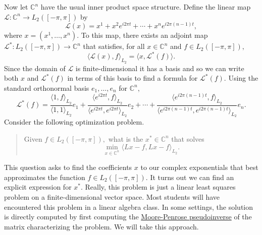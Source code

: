 Now let \(\mathbb{C}^n\) have the usual inner product space structure.
Define the linear map \(\mathcal{L}: \mathbb{C}^n \to L_2([-\pi, \pi])\) by
\[
  \mathcal{L}(x)
    =
      x^1 + x^2 e^{i 2 \pi t} + \cdots + x^{n} e^{i 2 \pi (n-1) t},
\]
where \(x = (x^1, \ldots, x^n).\)
To this map, there exists an adjoint map \(\mathcal{L}^*: L_2([-\pi, \pi]) \to \mathbb{C}^n\) that satisfies, for all \(x \in \mathbb{C}^n\) and \(f \in L_2([-\pi, \pi]),\)
\[
  \langle \mathcal{L}(x), f \rangle_{L_2}
  =
  \langle x, \mathcal{L}^*(f) \rangle.
\]
Since the domain of \(\mathcal{L}\) is finite-dimensional it has a basis and so we can write both \(x\) and \(\mathcal{L}^*(f)\) in terms of this basis to find a formula for \(\mathcal{L}^*(f).\)
Using the standard orthonormal basis \(e_1, \ldots, e_n\) for \(\mathbb{C}^n,\)
\[
  \mathcal{L}^*(f)
    =
      \frac{\langle 1, f \rangle_{L_2}}{\langle 1, 1\rangle_{L_2}}
      e_1
      +
      \frac{\langle e^{i 2 \pi t}, f \rangle_{L_2}}{\langle e^{i 2 \pi t}, e^{i 2 \pi t}\rangle_{L_2}}
      e_2
      +
      \cdots
      +
      \frac{\langle e^{i 2 \pi (n-1) t}, f \rangle_{L_2}}{\langle e^{i 2 \pi(n-1)t}, e^{i 2 \pi(n-1) t}\rangle_{L_2}}
      e_n.
\]
Consider the following optimization problem.
%
\begin{quote}
  Given \(f \in L_2([-\pi, \pi]),\) what is the \(x^* \in \mathbb{C}^n\) that solves
  \[
    \min_{x \in \mathbb{C}^n} \langle L x - f, L x - f \rangle_{L_2}.
  \]
\end{quote}
%
This question asks to find the coefficients \(x\) to our complex exponentials that best approximates the function \(f \in L_2([-\pi, \pi]).\)
It turns out we can find an explicit expression for \(x^*.\)
Really, this problem is just a linear least squares problem on a finite-dimensional vector space.
Most students will have encountered this problem in a linear algebra class.
In some settings, the solution is directly computed by first computing the \href{https://en.wikipedia.org/wiki/Moore%E2%80%93Penrose_inverse}{Moore-Penrose pseudoinverse} of the matrix characterizing the problem.
We will take this approach.

